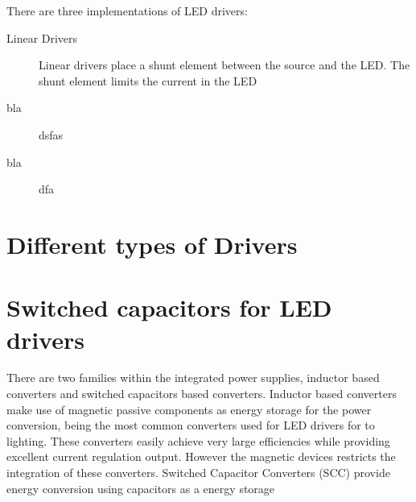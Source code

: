 \begin{figure}[!h]
\centering
{}
\caption {}
\label{fig:led_I-V}
\end{figure}

There are three implementations of LED drivers:

\begin{description}
  \item[Linear Drivers] Linear drivers place a shunt element between the source and the LED. The shunt element limits the current in the LED  
  \item[bla] dsfas
  \item[bla] dfa
\end{description}


\chapter{Different types of Drivers}

       
   


\chapter{Switched capacitors for LED drivers}

There are two families within the integrated power supplies, inductor based converters and switched capacitors based converters. Inductor based converters make use of magnetic passive components as energy storage for the power conversion, being the most common converters used for LED drivers for to lighting. These converters easily achieve very large efficiencies while providing excellent current regulation output. However the magnetic devices restricts the integration of these converters. Switched Capacitor Converters (SCC) provide energy conversion using capacitors as a energy storage 


